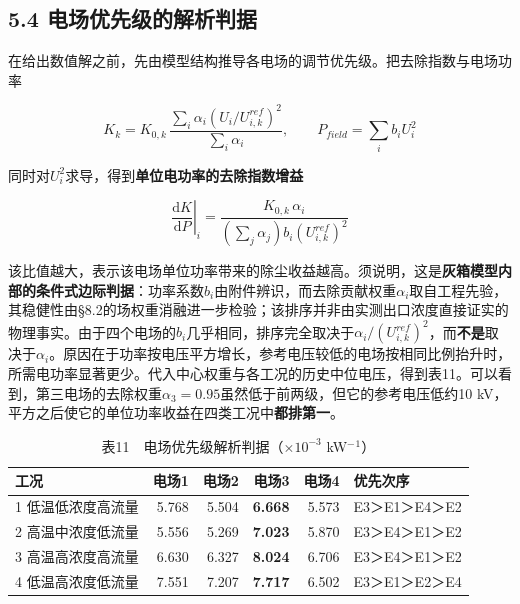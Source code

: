 \documentclass[UTF8,zihao=5,a4paper]{ctexart}
\begin{document}
\subsection*{5.4 电场优先级的解析判据}

在给出数值解之前，先由模型结构推导各电场的调节优先级。把去除指数与电场功率

\begin{equation}
K_k=K_{0,k}\,\frac{\sum_i\alpha_i\left(U_i/U_{i,k}^{ref}\right)^{2}}{\sum_i\alpha_i},
\qquad P_{field}=\sum_i b_iU_i^{2}
\end{equation}

同时对$U_i^{2}$求导，得到\textbf{单位电功率的去除指数增益}

\begin{equation}
\left.\frac{\mathrm{d}K}{\mathrm{d}P}\right|_i=\frac{K_{0,k}\,\alpha_i}{\left(\sum_j\alpha_j\right) b_i \left(U_{i,k}^{ref}\right)^{2}} 
\end{equation}

该比值越大，表示该电场单位功率带来的除尘收益越高。须说明，这是\textbf{灰箱模型内部的条件式边际判据}：功率系数$b_i$由附件辨识，而去除贡献权重$\alpha_i$取自工程先验，其稳健性由§8.2的场权重消融进一步检验；该排序并非由实测出口浓度直接证实的物理事实。由于四个电场的$b_i$几乎相同，排序完全取决于$\alpha_i/(U^{ref}_{i,k})^{2}$，而\textbf{不是}取决于$\alpha_i$。原因在于功率按电压平方增长，参考电压较低的电场按相同比例抬升时，所需电功率显著更少。代入中心权重与各工况的历史中位电压，得到表11。可以看到，第三电场的去除权重$\alpha_3=0.95$虽然低于前两级，但它的参考电压低约10 kV，平方之后使它的单位功率收益在四类工况中\textbf{都排第一}。


\begin{table}[htb]
\centering
\caption*{\normalsize 表11　电场优先级解析判据（$\times10^{-3}$ kW$^-$$^1$）}
\vspace{-2pt}
\begin{tabular}{lrrrrl}
\toprule
工况 & 电场1 & 电场2 & 电场3 & 电场4 & 优先次序 \\
\midrule
1 低温低浓度高流量 & 5.768 & 5.504 & \textbf{6.668} & 5.573 & E3＞E1＞E4＞E2 \\
2 高温中浓度低流量 & 5.556 & 5.269 & \textbf{7.023} & 5.870 & E3＞E4＞E1＞E2 \\
3 高温高浓度高流量 & 6.630 & 6.327 & \textbf{8.024} & 6.706 & E3＞E4＞E1＞E2 \\
4 低温高浓度低流量 & 7.551 & 7.207 & \textbf{7.717} & 6.502 & E3＞E1＞E2＞E4 \\
\bottomrule
\end{tabular}
\end{table}
\end{document}
